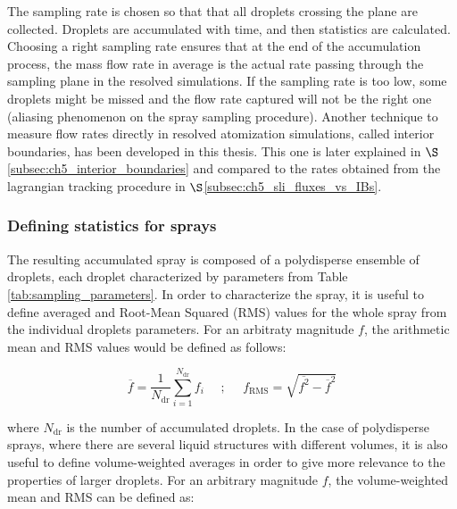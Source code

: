 The sampling rate is chosen so that that all droplets crossing the plane are collected. Droplets are accumulated with time, and then statistics are calculated. Choosing a right sampling rate ensures that at the end of the accumulation process, the mass flow rate in average is the actual rate passing through the sampling plane in the resolved simulations. If the sampling rate is too low, some droplets might be missed and the flow rate captured will not be the right one (aliasing phenomenon on the spray sampling procedure). Another technique to measure flow rates directly in resolved atomization simulations, called interior boundaries, has been developed in this thesis. This one is later explained in $\S$\ref{subsec:ch5_interior_boundaries} and compared to the rates obtained from the lagrangian tracking procedure in $\S$\ref{subsec:ch5_sli_fluxes_vs_IBs}. \\

\subsubsection*{Defining statistics for sprays}

The resulting accumulated spray is composed of a polydisperse ensemble of droplets, each droplet characterized by parameters from Table \ref{tab:sampling_parameters}. In order to characterize the spray, it is useful to define averaged and Root-Mean Squared (RMS) values for the whole spray from the individual droplets parameters. For an arbitraty magnitude $f$, the arithmetic mean and RMS values would be defined as follows:

\begin{equation}
\label{eq:ch4_f_arbitrary_mean_RMS_definition}
\overline{f} = \frac{1}{N_\mathrm{dr}} \sum_{i=1}^{N_\mathrm{dr}} f_i  ~~~~~~ ; ~~~~~~ f_\mathrm{RMS} = \sqrt{\overline{f^2} - \overline{f}^2}
\end{equation}


where $N_\mathrm{dr}$ is the number of accumulated droplets. In the case of polydisperse sprays, where there are several liquid structures with different volumes, it is also useful to define volume-weighted averages in order to give more relevance to the properties of larger droplets. For an arbitrary magnitude $f$, the volume-weighted mean and RMS can be defined as:

